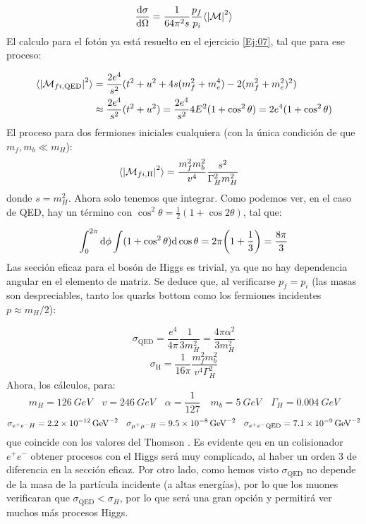 \begin{equation}
	\dv{\sigma}{\Omega} = \frac{1}{64\pi^2 s} \frac{p_f}{p_i} \langle \vqty{\Mcal}^2 \rangle
\end{equation}
El calculo para el fotón ya está resuelto en el ejercicio \ref{Ej:07}, tal que para ese proceso: 

\begin{align}
	\langle \vqty{\Mcal_{fi,\text{QED}}}^2 \rangle & = \frac{2e^4}{s^2} (t^2 + u^2 + 4s(m_f^2 + m_e^4) - 2(m_f^2+m_e^2)^2) \nonumber \\ &  \approx \frac{2e^4}{s^2}  (t^2 + u^2) = \frac{2e^4}{s^2}  4E^2 (1+\cos^2 \theta) = 2e^4 (1+\cos^2 \theta)
\end{align}
El proceso para dos fermiones iniciales cualquiera (con la única condición de que $m_f,m_b\ll m_H$):
\begin{align}
	\langle \vqty{\Mcal_{fi,\text{H}}}^2 \rangle & = \frac{m_f^2 m_b^2}{v^4} \frac{s^2}{\Gamma_H^2 m_H^2} \label{Ec:ej25-01}
\end{align}
donde $s=m_H^2$. Ahora solo tenemos que integrar. Como podemos ver, en el caso de QED, hay un término con $\cos^2 \theta = \frac{1}{2} (1+\cos 2\theta)$, tal que: 

\begin{equation}
	\int_0^{2\pi} \D \phi \int (1 + \cos^2 \theta) \D \cos \theta = 2 \pi \pqty{1+\frac{1}{3}} = \frac{8\pi}{3}
\end{equation}
Las sección eficaz para el bosón de Higgs es trivial, ya que no hay dependencia angular en el elemento de matriz. Se deduce que, al verificarse $p_f=p_i$ (las masas son despreciables, tanto los quarks bottom como los fermiones incidentes $p\approx m_H/2$):

\begin{equation}
	\sigma_\text{QED} = \frac{e^4}{4\pi} \frac{1}{3 m_H^2}  = \frac{4\pi \alpha^2}{3 m_H^2}
\end{equation}
\begin{equation}
	\sigma_\text{H} = \frac{1}{16\pi} \frac{m_f^2 m_b^2}{v^4 \Gamma_H^2} 
\end{equation}
Ahora, los cálculos, para: 
\begin{equation}
	m_H = \SI{126}{GeV} \quad v = \SI{246}{GeV} \quad \alpha = \frac{1}{127} \quad m_b = \SI{5}{GeV} \quad \Gamma_H = \SI{0.004}{GeV}
\end{equation}
\begin{equation} \small
	\sigma_{e^+ e^- H} = \SI{2.2e-12}{GeV^{-2}} \quad 
	\sigma_{\mu^+ \mu^- H} = \SI{9.5e-8}{GeV^{-2}} \quad 
	\sigma_{e^+ e^- \text{QED}} = \SI{7.1e-9}{GeV^{-2}} 
\end{equation}
que coincide con los valores del  Thomson \cite{thomson_modern_physics}. Es evidente qeu en un colisionador $e^+e^-$ obtener procesos con el Higgs será muy complicado, al haber un orden 3 de diferencia en la sección eficaz. Por otro lado, como hemos visto $\sigma_{\text{QED}}$ no depende de la masa de la partícula incidente (a altas energías), por lo que los muones verificaran que $\sigma_{\text{QED}}<\sigma_{H}$, por lo que será una gran opción y permitirá ver muchos más procesos Higgs.


